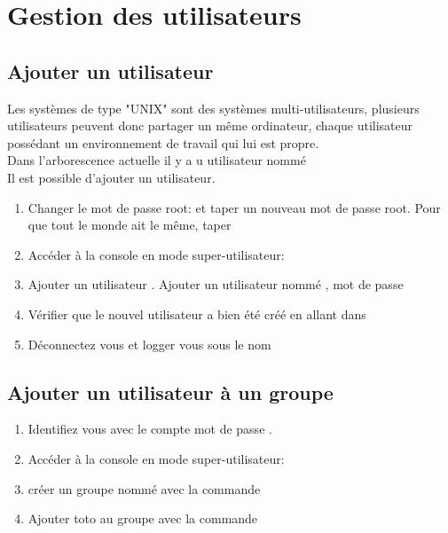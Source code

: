 \section{Gestion des utilisateurs}

\subsection{Ajouter un utilisateur}


Les systèmes de type "UNIX" sont des systèmes multi-utilisateurs, plusieurs utilisateurs peuvent donc partager un même ordinateur, chaque utilisateur possédant un environnement de travail qui lui est propre.\\

Dans l'arborescence actuelle il y a u utilisateur nommé \\

Il est possible d'ajouter un utilisateur.

\begin{enumerate}
	\item Changer le mot de passe root:  et taper un nouveau mot de passe root. Pour que tout le monde ait le même, taper 
	\item Accéder à la console en mode super-utilisateur: 
	\item Ajouter un utilisateur . Ajouter un utilisateur nommé , mot de passe 
	\item Vérifier que le nouvel utilisateur a bien été créé en allant dans 
	\item Déconnectez vous et logger vous sous le nom 
\end{enumerate}

\subsection{Ajouter un utilisateur à un groupe}

\begin{enumerate}
\item Identifiez vous avec le compte  mot de passe .
	\item Accéder à la console en mode super-utilisateur: 
	\item créer un groupe nommé  avec la commande 
	\item Ajouter toto au groupe  avec la commande 
	\end{enumerate}
	
